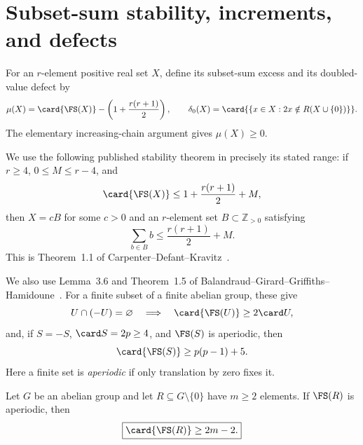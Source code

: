 \section{Subset-sum stability, increments, and defects}\label{sec:upper}
For an $r$-element positive real set $X$, define its subset-sum excess and its
doubled-value defect by
\[
 \mu(X)=\card{\FS(X)}-\left(1+\frac{r(r+1)}2\right),
 \qquad
 \delta_0(X)=\card{\{x\in X:2x\notin R(X\cup\{0\})\}}.
\]
The elementary increasing-chain argument gives $\mu(X)\geq0$.

We use the following published stability theorem in precisely its stated
range: if $r\geq4$, $0\leq M\leq r-4$, and
\[
 \card{\FS(X)}\leq1+\frac{r(r+1)}2+M,
\]
then $X=cB$ for some $c>0$ and an $r$-element set
$B\subset\mathbb Z_{>0}$ satisfying
\[
 \sum_{b\in B}b\leq\frac{r(r+1)}2+M.
\]
This is Theorem~1.1 of Carpenter--Defant--Kravitz~\cite{CDK2026}.

We also use Lemma~3.6 and Theorem~1.5 of
Balandraud--Girard--Griffiths--Hamidoune~\cite{BGGH2013}.  For a finite
subset of a finite abelian group, these give
\begin{equation}
 U\cap(-U)=\varnothing\quad\Longrightarrow\quad
 \card{\FS(U)}\geq2\card U,
 \label{eq:antisymmetric-bound}
\end{equation}
and, if $S=-S$, $\card S=2p\geq4$, and $\FS(S)$ is aperiodic, then
\begin{equation}
 \card{\FS(S)}\geq p(p-1)+5.
 \label{eq:symmetric-bound}
\end{equation}
Here a finite set is \emph{aperiodic} if only translation by zero fixes it.

\begin{lemma}\label{lem:aperiodic-linear}
Let $G$ be an abelian group and let
$R\subseteq G\setminus\{0\}$ have $m\geq2$ elements.  If $\FS(R)$ is
aperiodic, then
\begin{equation}
 \boxed{\card{\FS(R)}\geq2m-2.}
 \label{eq:aperiodic-linear}
\end{equation}
\end{lemma}

